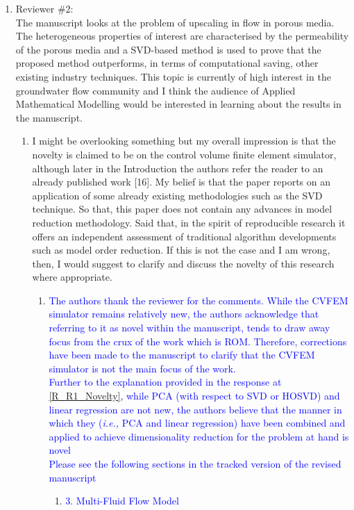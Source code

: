 \documentclass[11pt]{letter} %
\newcommand{\blue}{\textcolor{blue}}
\newcommand{\ie}{{\it i.e., }}
\begin{document}
\begin{letter}
{\begin{enumerate}
\item Reviewer \#2: \\
  The manuscript looks at the problem of upscaling in flow in porous media. The heterogeneous properties of interest are characterised by the permeability of the porous media and a SVD-based method is used to prove that the proposed method outperforms, in terms of computational saving, other existing industry techniques. This topic is currently of high interest in the groundwater flow community and I think the audience of Applied Mathematical Modelling would be interested in learning about the results in the manuscript.
  \begin{enumerate}
  \item \label{R_R2_Novelty} I might be overlooking something but my overall impression is that the novelty is claimed to be on the control volume finite element simulator, although later in the Introduction the authors refer the reader to an already published work [16]. My belief is that the paper reports on an application of some already existing methodologies such as the SVD technique. So that, this paper does not contain any advances in model reduction methodology. Said that, in the spirit of reproducible research it offers an independent assessment of traditional algorithm developments such as model order reduction. If this is not the case and I am wrong, then, I would suggest to clarify and discuss the novelty of this research where appropriate.
    \begin{enumerate}
      \item \label{R_R2_Novelty_1} \blue{The authors thank the reviewer for the comments. While the CVFEM simulator remains relatively new, the authors acknowledge that referring to it as novel within the manuscript, tends to draw away focus from the crux of the work which is ROM. Therefore, corrections have been made to the manuscript to clarify that the CVFEM simulator is not the main focus of the work.\\
        Further to the explanation provided in the response at \ref{R_R1_Novelty}, while PCA (with respect to SVD or HOSVD) and linear regression are not new, the authors believe that the manner in which they (\ie PCA and linear regression) have been combined and applied to achieve dimensionality reduction for the problem at hand is novel}\\
        \blue{Please see the following sections in the tracked version of the revised manuscript}
   \begin{enumerate}
 \item \blue{3. Multi-Fluid Flow Model}

\end{enumerate}
\end{enumerate}
\end{enumerate}
\end{enumerate}}
\end{letter}
\end{document}
